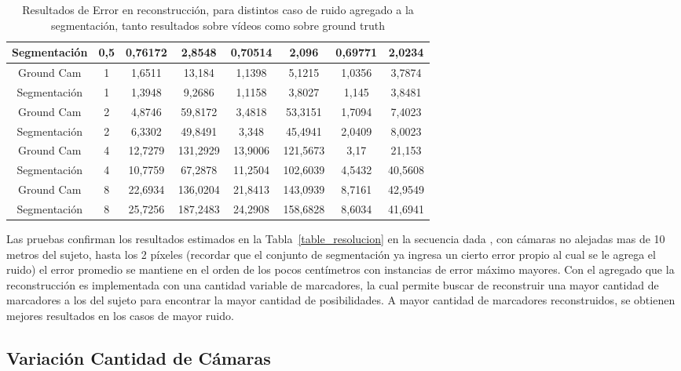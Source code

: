 \begin{table}[h]
{\begin{tabular}{cc|c|c|c|c|c|c|}
\multicolumn{1}{|c|}{Segmentación} & 0,5 & 0,76172 & 2,8548 & 0,70514 & 2,096 & 0,69771 & 2,0234 \\ \hline
\multicolumn{1}{|c|}{Ground Cam} & 1 & 1,6511 & 13,184 & 1,1398 & 5,1215 & 1,0356 & 3,7874 \\ \hline
\multicolumn{1}{|c|}{Segmentación} & 1 & 1,3948 & 9,2686 & 1,1158 & 3,8027 & 1,145 & 3,8481 \\ \hline
\multicolumn{1}{|c|}{Ground Cam} & 2 & 4,8746 & 59,8172 & 3,4818 & 53,3151 & 1,7094 & 7,4023 \\ \hline
\multicolumn{1}{|c|}{Segmentación} & 2 & 6,3302 & 49,8491 & 3,348 & 45,4941 & 2,0409 & 8,0023 \\ \hline
\multicolumn{1}{|c|}{Ground Cam} & 4 & 12,7279 & 131,2929 & 13,9006 & 121,5673 & 3,17 & 21,153 \\ \hline
\multicolumn{1}{|c|}{Segmentación} & 4 & 10,7759 & 67,2878 & 11,2504 & 102,6039 & 4,5432 & 40,5608 \\ \hline
\multicolumn{1}{|c|}{Ground Cam} & 8 & 22,6934 & 136,0204 & 21,8413 & 143,0939 & 8,7161 & 42,9549 \\ \hline
\multicolumn{1}{|c|}{Segmentación} & 8 & 25,7256 & 187,2483 & 24,2908 & 158,6828 & 8,6034 & 41,6941 \\ \hline
\end{tabular}
}
\caption{Resultados de Error en reconstrucción, para distintos caso de ruido agregado a la segmentación, tanto resultados sobre vídeos como sobre ground truth}
\end{table}

Las pruebas confirman los resultados estimados en la Tabla~\ref{table_resolucion} en la secuencia dada , con cámaras no alejadas mas de 10 metros del sujeto, hasta los 2 píxeles (recordar que el conjunto de segmentación ya ingresa un cierto error propio al cual se le agrega el ruido) el error promedio se mantiene en el orden de los pocos centímetros con instancias de error máximo mayores. Con el agregado que la reconstrucción es implementada con una cantidad variable de marcadores, la cual permite buscar de reconstruir una mayor cantidad de marcadores a los del sujeto para encontrar la mayor cantidad de posibilidades. A mayor cantidad de marcadores reconstruidos, se obtienen mejores resultados en los casos de mayor ruido.

\subsection{Variación Cantidad de Cámaras}

